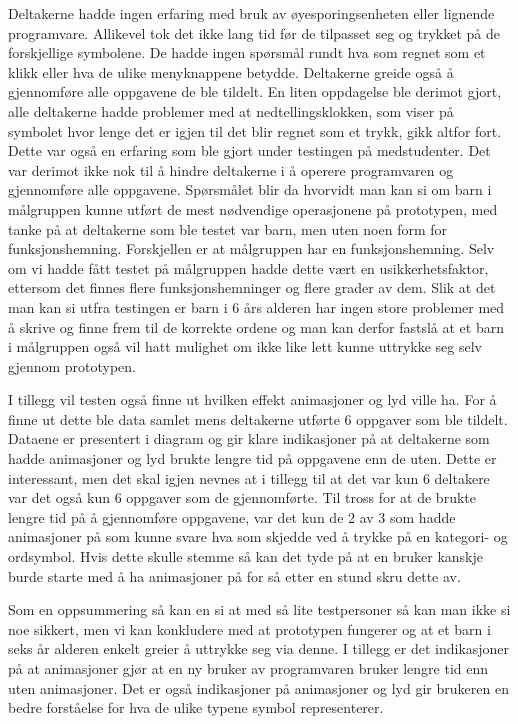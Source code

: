 Deltakerne hadde ingen erfaring med bruk av øyesporingsenheten eller lignende programvare. Allikevel tok det ikke lang tid før de tilpasset seg og trykket på de forskjellige symbolene. De hadde ingen spørsmål rundt hva som regnet som et klikk eller hva de ulike menyknappene betydde. Deltakerne greide også å gjennomføre alle oppgavene de ble tildelt. En liten oppdagelse ble derimot gjort, alle deltakerne hadde problemer med at nedtellingsklokken, som viser på symbolet hvor lenge det er igjen til det blir regnet som et trykk, gikk altfor fort. Dette var også en erfaring som ble gjort under testingen på medstudenter.  Det var derimot ikke nok til å hindre deltakerne i å operere programvaren og gjennomføre alle oppgavene. Spørsmålet blir da hvorvidt man kan si om barn i målgruppen kunne utført de mest nødvendige operasjonene på prototypen, med tanke på at deltakerne som ble testet var barn, men uten noen form for funksjonshemning. Forskjellen er at målgruppen har en funksjonshemning. Selv om vi hadde fått testet på målgruppen hadde dette vært en usikkerhetsfaktor, ettersom det finnes flere funksjonshemninger og flere grader av dem. Slik at det man kan si utfra testingen er barn i 6 års alderen har ingen store problemer med å skrive og finne frem til de korrekte ordene og man kan derfor fastslå at et barn i målgruppen også vil hatt mulighet om ikke like lett kunne uttrykke seg selv gjennom prototypen. 
 
I tillegg vil testen også finne ut hvilken effekt animasjoner og lyd ville ha. For å finne ut dette ble data samlet mens deltakerne utførte 6 oppgaver som ble tildelt. Dataene er presentert i diagram og gir klare indikasjoner på at deltakerne som hadde animasjoner og lyd brukte lengre tid på oppgavene enn de uten. Dette er interessant, men det skal igjen nevnes at i tillegg til at det var kun 6 deltakere var det også kun 6 oppgaver som de gjennomførte. Til tross for at de brukte lengre tid på å gjennomføre oppgavene, var det kun de 2 av 3 som hadde animasjoner på som kunne svare hva som skjedde ved å trykke på en kategori- og ordsymbol. Hvis dette skulle stemme så kan det tyde på at en bruker kanskje burde starte med å ha animasjoner på for så etter en stund skru dette av.  
 
Som en oppsummering så kan en si at med så lite testpersoner så kan man ikke si noe sikkert, men vi kan konkludere med at prototypen fungerer og at et barn i seks år alderen enkelt greier å uttrykke seg via denne. I tillegg er det indikasjoner på at animasjoner gjør at en ny bruker av programvaren bruker lengre tid enn uten animasjoner. Det er også indikasjoner på animasjoner og lyd gir brukeren en bedre forståelse for hva de ulike typene symbol representerer.  
 

 

 
 
 
 
 
 
 
 
 
 
 
 
